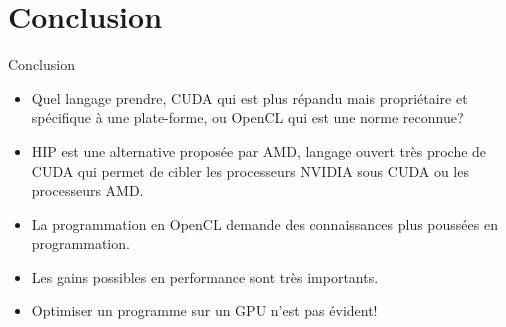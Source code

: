 \documentclass[10pt]{beamer}
\begin{document}
\section{Conclusion}

\begin{frame}{Conclusion}

  \begin{itemize}
    \item Quel langage prendre, CUDA qui est plus répandu mais propriétaire et spécifique à une plate-forme, ou OpenCL qui est une norme reconnue?

    \item HIP est une alternative proposée par AMD, langage ouvert très proche de CUDA qui permet de cibler les processeurs NVIDIA sous CUDA ou les processeurs AMD.

    \item La programmation en OpenCL demande des connaissances plus poussées en programmation.
    
    \item Les gains possibles en performance sont très importants.
    
    \item Optimiser un programme sur un GPU n'est pas évident!
  \end{itemize}
\end{frame}
\end{document}
